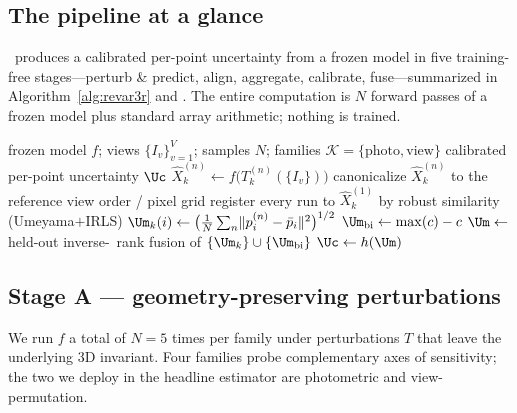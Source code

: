 \subsection{The pipeline at a glance}
\label{sec:method-overview}

\trustr\ produces a calibrated per-point uncertainty from a frozen model in five training-free
stages---perturb \& predict, align, aggregate, calibrate, fuse---summarized in
Algorithm~\ref{alg:revar3r} and . The entire computation is $N$ forward passes of
a frozen model plus standard array arithmetic; nothing is trained.

\begin{algorithm*}[t]
\caption{\trustr\ uncertainty (training-free)}
\label{alg:revar3r}
\small
\begin{algorithmic}[1]
\Require frozen model $f$; views $\{I_v\}_{v=1}^{V}$; samples $N$; families $\mathcal{K}{=}\{\mathrm{photo},\mathrm{view}\}$
\Ensure calibrated per-point uncertainty $\Uc$
    \State $\hat X^{(n)}_k \gets f\big(T^{(n)}_k(\{I_v\})\big)$ 
    \State canonicalize $\hat X^{(n)}_k$ to the reference view order / pixel grid
  \EndFor
  \State register every run to $\hat X^{(1)}_k$ by robust similarity (Umeyama${+}$IRLS)
  \State $\Um_k(i) \gets \big(\tfrac1N\textstyle\sum_n \lVert p^{(n)}_i - \bar p_i\rVert^2\big)^{1/2}$ 
\EndFor
\State $\Um_{\mathrm{bi}} \gets \max(c) - c$ 
\State $\Um \gets$ held-out inverse-\ause\ rank fusion of $\{\Um_k\} \cup \{\Um_{\mathrm{bi}}\}$
\State \Return $\Uc \gets h(\Um)$ 
\end{algorithmic}
\end{algorithm*}

\subsection{Stage A --- geometry-preserving perturbations}
\label{sec:method-perturb}

We run $f$ a total of $N{=}5$ times per family under perturbations $T$ that leave the underlying 3D
invariant. Four families probe complementary axes of sensitivity; the two we deploy in the headline
estimator are photometric and view-permutation.

